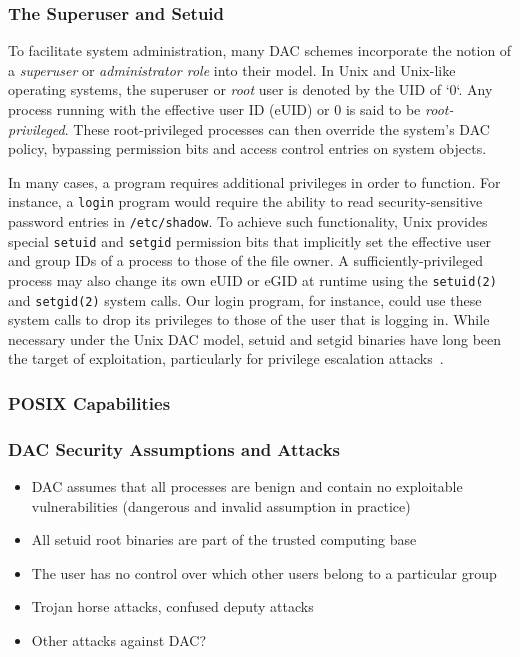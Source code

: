 \subsubsection*{The Superuser and Setuid}

To facilitate system administration, many DAC schemes incorporate the notion of
a \textit{superuser} or \textit{administrator role} into their model. In Unix and
Unix-like operating systems, the superuser or \textit{root} user is denoted by the UID of
`0`. Any process running with the effective user ID (eUID) or 0 is said to be
\textit{root-privileged}. These root-privileged processes can then override the system's
DAC policy, bypassing permission bits and access control entries on system objects.

In many cases, a program requires additional privileges in order to function. For
instance, a \texttt{login} program would require the ability to read security-sensitive
password entries in \texttt{/etc/shadow}. To achieve such functionality, Unix provides
special \texttt{setuid} and \texttt{setgid} permission bits that implicitly set the
effective user and group IDs of a process to those of the file owner.
A sufficiently-privileged process may also change its own eUID or eGID at runtime using
the \texttt{setuid(2)} and \texttt{setgid(2)} system calls. Our login program, for
instance, could use these system calls to drop its privileges to those of the user that is
logging in. While necessary under the Unix DAC model, setuid and setgid binaries have long
been the target of exploitation, particularly for privilege escalation
attacks~\cite{dittmer2014_setuid, van_oorschot2020_tools_jewels, jaeger2008_os_security}.

\subsubsection*{POSIX Capabilities}


\subsubsection*{DAC Security Assumptions and Attacks}


\begin{inprogress}
  \begin{itemize}
    \item DAC assumes that all processes are benign and contain no exploitable vulnerabilities (dangerous and invalid assumption in practice)
    \item All setuid root binaries are part of the trusted computing base
    \item The user has no control over which other users belong to a particular group
    \item Trojan horse attacks, confused deputy attacks~\cite{shu2016_security_isolation_study}
    \item Other attacks against DAC?
  \end{itemize}
\end{inprogress}

